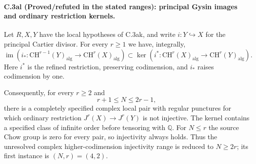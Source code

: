 \paragraph{C.3al (Proved/refuted in the stated ranges): principal Gysin images and ordinary restriction kernels.}
Let $R,X,Y$ have the local hypotheses of C.3ak, and
write $i:Y\hookrightarrow X$ for the principal Cartier
divisor. For every $r\ge1$ we have, integrally,
\[
 \operatorname{im}\!\left(
 i_*:\mathrm{CH}^{r-1}(Y)_{\mathrm{alg}}
              \longrightarrow\mathrm{CH}^r(X)_{\mathrm{alg}}
              \right)
 \subset
 \ker\!\left(
 i^*:\mathrm{CH}^r(X)_{\mathrm{alg}}
              \longrightarrow\mathrm{CH}^r(Y)_{\mathrm{alg}}
              \right).
\]
Here $i^*$ is the refined restriction, preserving
codimension, and $i_*$ raises codimension by one.

Consequently, for every $r\ge2$ and
\[
                         r+1\le N\le2r-1,
\]
there is a completely specified complex local pair with
regular punctures for which ordinary restriction
$J^r(X)\to J^r(Y)$ is not injective. The kernel contains
a specified class of infinite order before tensoring
with $\mathbb Q$. For $N\le r$ the source Chow group is
zero for every pair, so injectivity always holds.
Thus the unresolved complex higher-codimension
injectivity range is reduced to $N\ge2r$; its first
instance is $(N,r)=(4,2)$.

